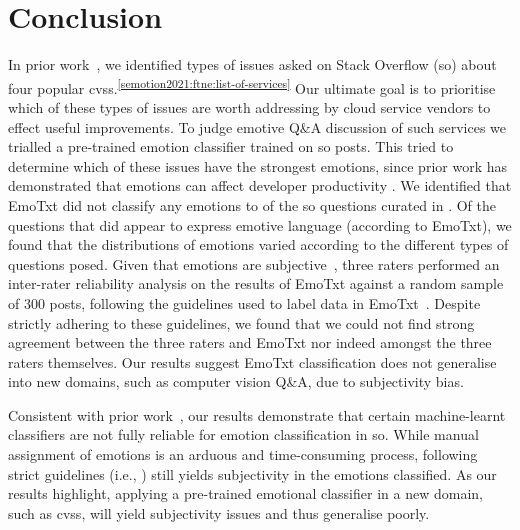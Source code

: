 \section{Conclusion}\label{semotion2021:sec:conclusion}

In prior work~\citep{Cummaudo:2020icse}, we identified types of issues asked on Stack Overflow (\gls{so}) about four popular \glspl{cvs}.\textsuperscript{\ref{semotion2021:ftne:list-of-services}} Our ultimate goal is to prioritise which of these types of issues are worth addressing by cloud service vendors to effect useful improvements. To judge emotive Q\&A discussion of such services we trialled a pre-trained emotion classifier trained on \gls{so} posts. This tried to determine which of these issues have the strongest emotions, since prior work has demonstrated that emotions can affect developer productivity \citep{murgia2014, ortu2016, gachechiladze2017}. We identified that EmoTxt did not classify any emotions to \SEMPctNoEmotionAverage{} of the \SEMNumTotalPostsFromSO{} \gls{so} questions curated in \citep{Cummaudo:2020icse}. Of the questions that did appear to express emotive language (according to EmoTxt), we found that the distributions of emotions varied according to the different types of questions posed. Given that emotions are subjective~\citep{curumsing2017}, three raters  performed an inter-rater reliability analysis on the results of EmoTxt against a random sample of 300 posts, following the guidelines used to label data in EmoTxt~\citep{novielli2018}. Despite strictly adhering to these guidelines, we found that we could not find strong agreement between the three raters and EmoTxt nor indeed amongst the three raters themselves. Our results suggest EmoTxt classification does not generalise into new domains, such as computer vision Q\&A, due to subjectivity bias.

Consistent with prior work~\citep{lin2018sentiment}, our results demonstrate that certain machine-learnt classifiers are not fully reliable for emotion classification in \gls{so}. While manual assignment of emotions is an arduous and time-consuming process, following strict guidelines (i.e., \citep{novielli2018}) still yields subjectivity in the emotions classified. As our results highlight, applying a pre-trained emotional classifier in a new domain, such as \glspl{cvs}, will yield subjectivity issues and thus generalise poorly.